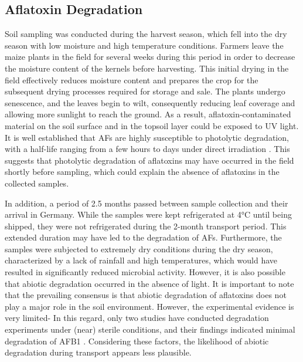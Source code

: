 \begin{refsection}
\subsection{Aflatoxin Degradation}

Soil sampling was conducted during the harvest season, which fell into the dry season with low moisture and high temperature conditions. Farmers leave the maize plants in the field for several weeks during this period in order to decrease the moisture content of the kernels before harvesting. This initial drying in the field effectively reduces moisture content and prepares the crop for the subsequent drying processes required for storage and sale. The plants undergo senescence, and the leaves begin to wilt, consequently reducing leaf coverage and allowing more sunlight to reach the ground. As a result, aflatoxin-contaminated material on the soil surface and in the topsoil layer could be exposed to UV light. It is well established that AFs are highly susceptible to photolytic degradation, with a half-life ranging from a few hours to days under direct irradiation \citep{diao2015ultraviolet}. This suggests that photolytic degradation of aflatoxins may have occurred in the field shortly before sampling, which could explain the absence of aflatoxins in the collected samples. 

In addition, a period of 2.5 months passed between sample collection and their arrival in Germany. While the samples were kept refrigerated at 4°C until being shipped, they were not refrigerated during the 2-month transport period. This extended duration may have led to the degradation of AFs. Furthermore, the samples were subjected to extremely dry conditions during the dry season, characterized by a lack of rainfall and high temperatures, which would have resulted in significantly reduced microbial activity. However, it is also possible that abiotic degradation occurred in the absence of light. It is important to note that the prevailing consensus is that abiotic degradation of aflatoxins does not play a major role in the soil environment. However, the experimental evidence is very limited- In this regard, only two studies have conducted degradation experiments under (near) sterile conditions, and their findings indicated minimal degradation of AFB1 \citep{accinelli2008aspergillus, starr2017solvent}. Considering these factors, the likelihood of abiotic degradation during transport appears less plausible.



\end{refsection}
